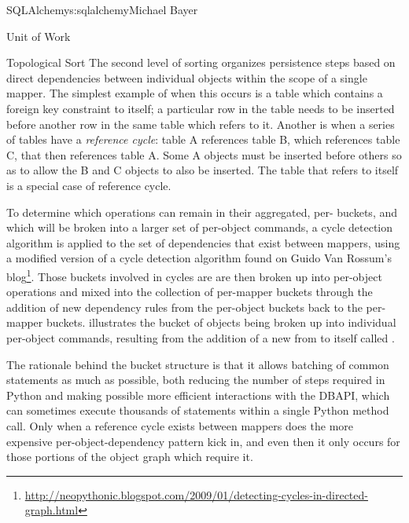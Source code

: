 \begin{aosachapter}{SQLAlchemy}{s:sqlalchemy}{Michael Bayer}
\begin{aosasect1}{Unit of Work}
\begin{aosasect2}{Topological Sort}
The second level of sorting organizes persistence steps based on direct dependencies between
individual objects within the scope of a single mapper.   The simplest example of when this occurs
is a table which contains a foreign key
constraint to itself; a particular row in the table needs to be inserted before another row
in the same table which refers to it.   Another
is when a series of tables have a \emph{reference cycle}: table A references table B, which references
table C, that then references table A.  Some A objects must be inserted before others so as to
allow the B and C objects to also be inserted.   The table that refers to itself is a special case of
reference cycle.

To determine which operations can remain in their aggregated, per- buckets, and which
will be broken into a larger set of per-object commands, a cycle detection algorithm is applied to
the set of dependencies that exist between mappers, using a modified version of a cycle
detection algorithm found on Guido Van Rossum's blog\footnote{\url{http://neopythonic.blogspot.com/2009/01/detecting-cycles-in-directed-graph.html}}.  Those buckets involved in cycles are are
then broken up into per-object operations and mixed into the collection of per-mapper buckets through the
addition of new dependency rules from the per-object buckets back to the
per-mapper buckets.    illustrates
the bucket of  objects being broken up into individual per-object commands,
resulting from the addition of a new  from  to itself called .


The rationale behind the bucket structure is that it allows batching of common
statements as much as possible, both reducing the number of steps required in
Python and making possible more efficient interactions with the DBAPI,
which can sometimes execute thousands of statements within a single Python
method call.   Only when a reference cycle exists between mappers does the
more expensive per-object-dependency pattern kick in, and even then
it only occurs for those portions of the object graph which require it.

\end{aosasect2}

\end{aosasect1}


\end{aosachapter}
